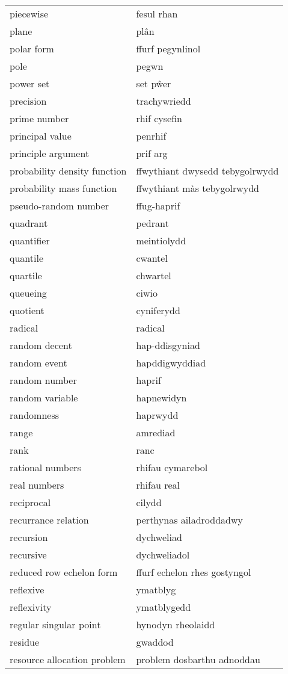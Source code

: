 \begin{supertabular}{p{0.22\textwidth}p{0.22\textwidth}}
piecewise & fesul rhan \\
plane & plân \\
polar form & ffurf pegynlinol \\
pole & pegwn \\
power set & set pŵer \\
precision & trachywriedd \\
prime number & rhif cysefin \\
principal value & penrhif \\
principle argument & prif arg \\
probability density function & ffwythiant dwysedd tebygolrwydd \\
probability mass function & ffwythiant màs tebygolrwydd \\
pseudo-random number & ffug-haprif \\
quadrant & pedrant \\
quantifier & meintiolydd \\
quantile & cwantel \\
quartile & chwartel \\
queueing & ciwio \\
quotient & cyniferydd \\
radical & radical \\
random decent & hap-ddisgyniad \\
random event & hapddigwyddiad \\
random number & haprif \\
random variable & hapnewidyn \\
randomness & haprwydd \\
range & amrediad \\
rank & ranc \\
rational numbers & rhifau cymarebol \\
real numbers & rhifau real \\
reciprocal & cilydd \\
recurrance relation & perthynas ailadroddadwy \\
recursion & dychweliad \\
recursive & dychweliadol \\
reduced row echelon form & ffurf echelon rhes gostyngol \\
reflexive & ymatblyg \\
reflexivity & ymatblygedd \\
regular singular point & hynodyn rheolaidd \\
residue & gwaddod \\
resource allocation problem & problem dosbarthu adnoddau \\

\end{supertabular}
